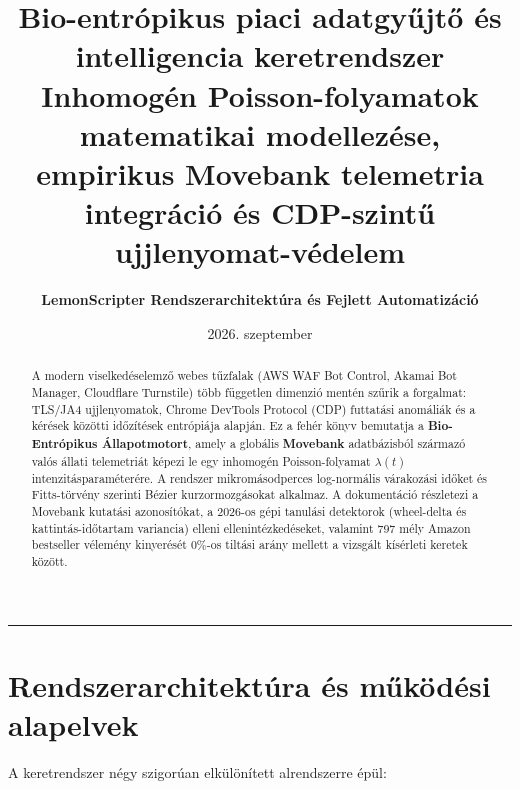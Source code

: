 \documentclass[11pt,a4paper]{article}
\title{\textbf{\LARGE Bio-entrópikus piaci adatgyűjtő és intelligencia keretrendszer}\\[0.4em]
\Large Inhomogén Poisson-folyamatok matematikai modellezése, empirikus Movebank telemetria integráció és CDP-szintű ujjlenyomat-védelem}
\author{\textbf{LemonScripter Rendszerarchitektúra és Fejlett Automatizáció}}
\date{2026. szeptember}
\begin{document}
\maketitle
\thispagestyle{empty}

\begin{abstract}
A modern viselkedéselemző webes tűzfalak (AWS WAF Bot Control, Akamai Bot Manager, Cloudflare Turnstile) több független dimenzió mentén szűrik a forgalmat: TLS/JA4 ujjlenyomatok, Chrome DevTools Protocol (CDP) futtatási anomáliák és a kérések közötti időzítések entrópiája alapján. Ez a fehér könyv bemutatja a \textbf{Bio-Entrópikus Állapotmotort}, amely a globális \textbf{Movebank} adatbázisból származó valós állati telemetriát képezi le egy inhomogén Poisson-folyamat $\lambda(t)$ intenzitásparaméterére. A rendszer mikromásodperces log-normális várakozási időket és Fitts-törvény szerinti Bézier kurzormozgásokat alkalmaz. A dokumentáció részletezi a Movebank kutatási azonosítókat, a 2026-os gépi tanulási detektorok (wheel-delta és kattintás-időtartam variancia) elleni ellenintézkedéseket, valamint 797 mély Amazon bestseller vélemény kinyerését 0\%-os tiltási arány mellett a vizsgált kísérleti keretek között.
\end{abstract}

\vspace{0.6em}
\hrule
\vspace{1.0em}

\section{Rendszerarchitektúra és működési alapelvek}

A keretrendszer négy szigorúan elkülönített alrendszerre épül:
\end{document}
